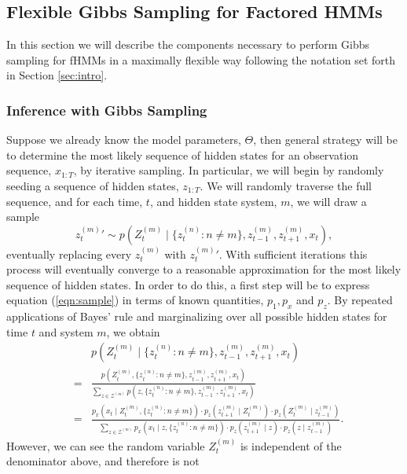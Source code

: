 \documentclass{amsart}
\begin{document}
\subsection{Flexible Gibbs Sampling for Factored HMMs}

In this section we will describe the components necessary to perform Gibbs 
sampling for fHMMs in a maximally flexible way following the notation set forth 
in Section \ref{sec:intro}.  

\subsubsection{Inference with Gibbs Sampling}
Suppose we already know the model parameters, 
$\Theta$, then general strategy will be to determine the most 
likely sequence of hidden states for an observation sequence, $x_{1:T}$, by iterative 
sampling.  In particular, we will begin by randomly seeding a sequence of hidden 
states, $z_{1:T}$.  We will randomly traverse the full sequence, and for each time, 
$t$, and hidden state system, $m$, we will draw a sample  
\begin{equation}\label{eqn:sample}
{z_t^{(m)}}'\sim p(Z_t^{(m)}\mid \{z_t^{(n)}:n\neq m\},z_{t-1}^{(m)}, z_{t+1}^{(m)}, x_t),
\end{equation}
eventually replacing every $z_t^{(m)}$ with ${z_t^{(m)}}'$.  With sufficient 
iterations this process will eventually converge to a reasonable approximation 
for the most likely sequence of hidden states.  In order to do this, a first 
step will be to express equation (\ref{eqn:sample}) in terms of known 
quantities, $p_1,p_x$ and $p_z$.  By repeated applications of Bayes' rule and marginalizing over all possible hidden 
states for time $t$ and system $m$, we obtain 
\begin{eqnarray*}
&&p(Z_t^{(m)}\mid \{z_t^{(n)}:n\neq m\},z_{t-1}^{(m)}, z_{t+1}^{(m)}, x_t)\\
& = & \frac{
p(Z_t^{(m)},\{z_t^{(n)}:n\neq m\},z_{t-1}^{(m)}, z_{t+1}^{(m)}, x_t)
}{
\sum_{z\in \mathcal Z^{(m)}}p(z,\{z_t^{(n)}:n\neq m\},z_{t-1}^{(m)}, 
z_{t+1}^{(m)}, x_t)
}\\
& = & \frac{
p_x(x_t\mid Z_t^{(m)},\{z_t^{(n)}:n\neq m\})\cdot
p_z(z_{t+1}^{(m)}\mid Z_t^{(m)})\cdot
p_z(Z_t^{(m)}\mid z_{t-1}^{(m)})
}{
\sum_{z\in \mathcal Z^{(m)}}
p_x(x_t\mid z,\{z_t^{(n)}:n\neq m\})\cdot
p_z(z_{t+1}^{(m)}\mid z)\cdot
p_z(z\mid z_{t-1}^{(m)})
}.
\end{eqnarray*}
However, we can see the random variable $Z_t^{(m)}$ is independent of the 
denominator above, and therefore is not 
\end{document}
